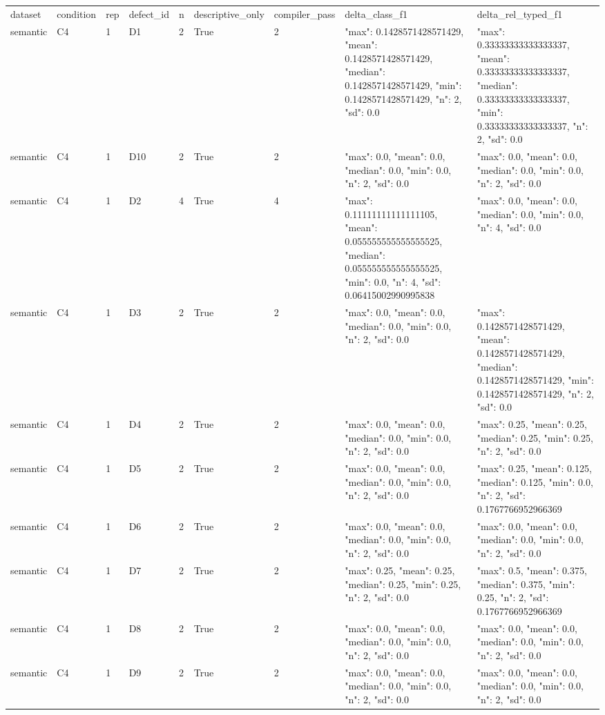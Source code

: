 \begin{tabular}{lllllllll}
dataset & condition & rep & defect\_id & n & descriptive\_only & compiler\_pass & delta\_class\_f1 & delta\_rel\_typed\_f1 \\
semantic & C4 & 1 & D1 & 2 & True & 2 & {"max": 0.1428571428571429, "mean": 0.1428571428571429, "median": 0.1428571428571429, "min": 0.1428571428571429, "n": 2, "sd": 0.0} & {"max": 0.33333333333333337, "mean": 0.33333333333333337, "median": 0.33333333333333337, "min": 0.33333333333333337, "n": 2, "sd": 0.0} \\
semantic & C4 & 1 & D10 & 2 & True & 2 & {"max": 0.0, "mean": 0.0, "median": 0.0, "min": 0.0, "n": 2, "sd": 0.0} & {"max": 0.0, "mean": 0.0, "median": 0.0, "min": 0.0, "n": 2, "sd": 0.0} \\
semantic & C4 & 1 & D2 & 4 & True & 4 & {"max": 0.11111111111111105, "mean": 0.055555555555555525, "median": 0.055555555555555525, "min": 0.0, "n": 4, "sd": 0.06415002990995838} & {"max": 0.0, "mean": 0.0, "median": 0.0, "min": 0.0, "n": 4, "sd": 0.0} \\
semantic & C4 & 1 & D3 & 2 & True & 2 & {"max": 0.0, "mean": 0.0, "median": 0.0, "min": 0.0, "n": 2, "sd": 0.0} & {"max": 0.1428571428571429, "mean": 0.1428571428571429, "median": 0.1428571428571429, "min": 0.1428571428571429, "n": 2, "sd": 0.0} \\
semantic & C4 & 1 & D4 & 2 & True & 2 & {"max": 0.0, "mean": 0.0, "median": 0.0, "min": 0.0, "n": 2, "sd": 0.0} & {"max": 0.25, "mean": 0.25, "median": 0.25, "min": 0.25, "n": 2, "sd": 0.0} \\
semantic & C4 & 1 & D5 & 2 & True & 2 & {"max": 0.0, "mean": 0.0, "median": 0.0, "min": 0.0, "n": 2, "sd": 0.0} & {"max": 0.25, "mean": 0.125, "median": 0.125, "min": 0.0, "n": 2, "sd": 0.1767766952966369} \\
semantic & C4 & 1 & D6 & 2 & True & 2 & {"max": 0.0, "mean": 0.0, "median": 0.0, "min": 0.0, "n": 2, "sd": 0.0} & {"max": 0.0, "mean": 0.0, "median": 0.0, "min": 0.0, "n": 2, "sd": 0.0} \\
semantic & C4 & 1 & D7 & 2 & True & 2 & {"max": 0.25, "mean": 0.25, "median": 0.25, "min": 0.25, "n": 2, "sd": 0.0} & {"max": 0.5, "mean": 0.375, "median": 0.375, "min": 0.25, "n": 2, "sd": 0.1767766952966369} \\
semantic & C4 & 1 & D8 & 2 & True & 2 & {"max": 0.0, "mean": 0.0, "median": 0.0, "min": 0.0, "n": 2, "sd": 0.0} & {"max": 0.0, "mean": 0.0, "median": 0.0, "min": 0.0, "n": 2, "sd": 0.0} \\
semantic & C4 & 1 & D9 & 2 & True & 2 & {"max": 0.0, "mean": 0.0, "median": 0.0, "min": 0.0, "n": 2, "sd": 0.0} & {"max": 0.0, "mean": 0.0, "median": 0.0, "min": 0.0, "n": 2, "sd": 0.0} \\

\end{tabular}
